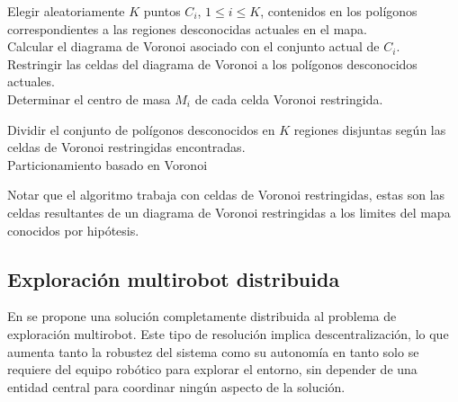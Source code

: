 \begin{algorithm}
\SetAlgoLined
    Elegir aleatoriamente $K$ puntos $C_i$, $1 \leq i \leq K$, contenidos en los polígonos correspondientes a las regiones desconocidas actuales en el mapa.\\
    Calcular el diagrama de Voronoi asociado con el conjunto actual de $C_i$.\\
    Restringir las celdas del diagrama de Voronoi a los polígonos desconocidos actuales.\\
    Determinar el centro de masa $M_i$ de cada celda Voronoi restringida.\\
    
    Dividir el conjunto de polígonos desconocidos en $K$ regiones disjuntas según las celdas de Voronoi restringidas encontradas.\\
    \caption{Particionamiento basado en Voronoi}
    \label{alg:particionamientovoronoi}
    
\end{algorithm}

Notar que el algoritmo trabaja con celdas de Voronoi restringidas, estas son las celdas resultantes de un diagrama de Voronoi restringidas a los limites del mapa conocidos por hipótesis.



\subsection{Exploración multirobot distribuida} 

En \cite{Lopez-Perez2018} se propone una solución completamente distribuida al problema de exploración multirobot. Este tipo de resolución implica descentralización, lo que aumenta tanto la robustez del sistema como su autonomía en tanto solo se requiere del equipo robótico para explorar el entorno, sin depender de una entidad central para coordinar ningún aspecto de la solución. %

